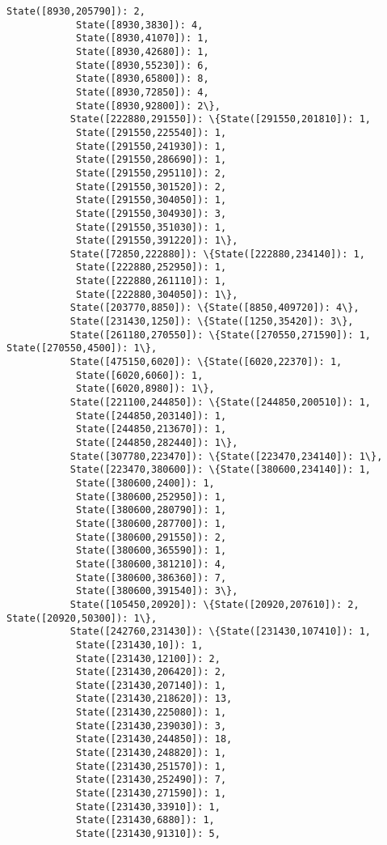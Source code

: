 \documentclass[11pt]{article}
\begin{document}
\begin{Verbatim}[commandchars=\\\{\}]
            State([8930,205790]): 2,
            State([8930,3830]): 4,
            State([8930,41070]): 1,
            State([8930,42680]): 1,
            State([8930,55230]): 6,
            State([8930,65800]): 8,
            State([8930,72850]): 4,
            State([8930,92800]): 2\},
           State([222880,291550]): \{State([291550,201810]): 1,
            State([291550,225540]): 1,
            State([291550,241930]): 1,
            State([291550,286690]): 1,
            State([291550,295110]): 2,
            State([291550,301520]): 2,
            State([291550,304050]): 1,
            State([291550,304930]): 3,
            State([291550,351030]): 1,
            State([291550,391220]): 1\},
           State([72850,222880]): \{State([222880,234140]): 1,
            State([222880,252950]): 1,
            State([222880,261110]): 1,
            State([222880,304050]): 1\},
           State([203770,8850]): \{State([8850,409720]): 4\},
           State([231430,1250]): \{State([1250,35420]): 3\},
           State([261180,270550]): \{State([270550,271590]): 1, State([270550,4500]): 1\},
           State([475150,6020]): \{State([6020,22370]): 1,
            State([6020,6060]): 1,
            State([6020,8980]): 1\},
           State([221100,244850]): \{State([244850,200510]): 1,
            State([244850,203140]): 1,
            State([244850,213670]): 1,
            State([244850,282440]): 1\},
           State([307780,223470]): \{State([223470,234140]): 1\},
           State([223470,380600]): \{State([380600,234140]): 1,
            State([380600,2400]): 1,
            State([380600,252950]): 1,
            State([380600,280790]): 1,
            State([380600,287700]): 1,
            State([380600,291550]): 2,
            State([380600,365590]): 1,
            State([380600,381210]): 4,
            State([380600,386360]): 7,
            State([380600,391540]): 3\},
           State([105450,20920]): \{State([20920,207610]): 2, State([20920,50300]): 1\},
           State([242760,231430]): \{State([231430,107410]): 1,
            State([231430,10]): 1,
            State([231430,12100]): 2,
            State([231430,206420]): 2,
            State([231430,207140]): 1,
            State([231430,218620]): 13,
            State([231430,225080]): 1,
            State([231430,239030]): 3,
            State([231430,244850]): 18,
            State([231430,248820]): 1,
            State([231430,251570]): 1,
            State([231430,252490]): 7,
            State([231430,271590]): 1,
            State([231430,33910]): 1,
            State([231430,6880]): 1,
            State([231430,91310]): 5,

\end{Verbatim}
\end{document}
